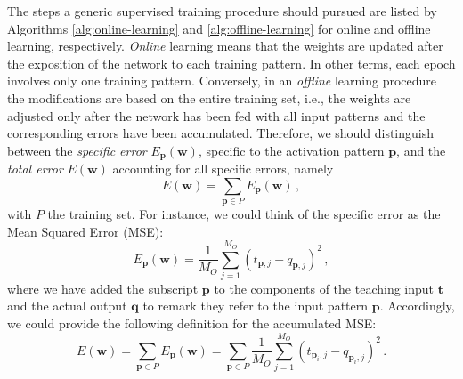 \documentclass[12pt, a4paper, twoside, openright]{report}
\numberwithin{equation}{chapter}
\theoremstyle{theorem}
\theoremstyle{definition}
\theoremstyle{remark}
\theoremstyle{proposition}
\numberwithin{figure}{chapter}
\begin{document}
		The steps a generic supervised training procedure should pursued are listed by Algorithms \ref{alg:online-learning} and \ref{alg:offline-learning} for online and offline learning, respectively. \emph{Online} learning means that the weights are updated after the exposition of the network to each training pattern. In other terms, each epoch involves only one training pattern. Conversely, in an \emph{offline} learning procedure the modifications are based on the entire training set, i.e., the weights are adjusted only after the network has been fed with all input patterns and the corresponding errors have been accumulated. Therefore, we should distinguish between the \emph{specific error} $E_{\boldsymbol{p}}(\boldsymbol{w})$, specific to the activation pattern $\boldsymbol{p}$, and the \emph{total error} $E(\boldsymbol{w})$ accounting for all specific errors, namely
		\begin{equation}
			\label{eq:accumulated-error}
			E(\boldsymbol{w}) = \sum_{\boldsymbol{p} \in P} E_{\boldsymbol{p}}(\boldsymbol{w}) \, ,
		\end{equation}
		with $P$ the training set. For instance, we could think of the specific error as the Mean Squared Error (MSE): 
		\begin{equation}
			\label{eq:mse}
			E_{\boldsymbol{p}}(\boldsymbol{w}) = \dfrac{1}{M_O} \sum_{j = 1}^{M_O} \left( t_{\boldsymbol{p},j} - q_{\boldsymbol{p},j} \right)^2 \, ,
		\end{equation}
		where we have added the subscript $\boldsymbol{p}$ to the components of the teaching input $\boldsymbol{t}$ and the actual output $\boldsymbol{q}$ to remark they refer to the input pattern $\boldsymbol{p}$. Accordingly, we could provide the following definition for the accumulated MSE:
		\begin{equation}
			\label{eq:accumulated-mse}
			E(\boldsymbol{w}) = \sum_{\boldsymbol{p} \in P} E_{\boldsymbol{p}}(\boldsymbol{w}) = \sum_{\boldsymbol{p} \in P} \dfrac{1}{M_O} \sum_{j = 1}^{M_O} \left( t_{\boldsymbol{p}_i,j} - q_{\boldsymbol{p}_i,j} \right)^2 \, .
		\end{equation}
				
		\vspace*{0.3cm}
		
\end{document}
